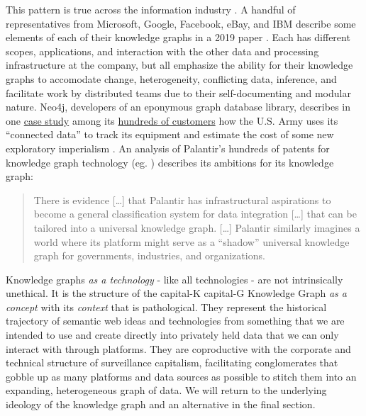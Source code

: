 This pattern is true across the information industry \cite{sequedaDesigningBuildingEnterprise2021} . A handful of
representatives from Microsoft, Google, Facebook, eBay, and IBM describe
some elements of each of their knowledge graphs in a 2019 paper \cite{noyIndustryscaleKnowledgeGraphs2019} . Each has different
scopes, applications, and interaction with the other data and processing
infrastructure at the company, but all emphasize the ability for their
knowledge graphs to accomodate change, heterogeneity, conflicting data,
inference, and facilitate work by distributed teams due to their
self-documenting and modular nature. Neo4j, developers of an eponymous
graph database library, describes in one
\href{https://neo4j.com/case-studies/us-army/}{case study} among its
\href{https://neo4j.com/customers/}{hundreds of customers} how the U.S.
Army uses its ``connected data'' to track its equipment and estimate the
cost of some new exploratory imperialism \cite{neo4jNeo4jArmyCase2021} . An analysis of Palantir's hundreds of
patents for knowledge graph technology (eg. \cite{cohenSystemMethodSharing2015, mathuraAutomatedDatabaseAnalysis2017, yousafSystemsMethodsUser2018, knudsonSystemsMethodsAnnotating2021} )
describes its ambitions for its knowledge graph:

\begin{quote}
There is evidence {[}\ldots{]} that Palantir has infrastructural
aspirations to become a general classification system for data
integration {[}\ldots{]} that can be tailored into a universal knowledge
graph. {[}\ldots{]} Palantir similarly imagines a world where its
platform might serve as a ``shadow'' universal knowledge graph for
governments, industries, and organizations. \cite{iliadisSeerSeenSurveying2022} 
\end{quote}

Knowledge graphs \emph{as a technology} - like all technologies - are
not intrinsically unethical. It is the structure of the capital-K
capital-G Knowledge Graph \emph{as a concept} with its \emph{context}
that is pathological. They represent the historical trajectory of
semantic web ideas and technologies from something that we are intended
to use and create directly into privately held data that we can only
interact with through platforms. They are coproductive with the
corporate and technical structure of surveillance capitalism,
facilitating conglomerates that gobble up as many platforms and data
sources as possible to stitch them into an expanding, heterogeneous
graph of data. We will return to the underlying ideology of the
knowledge graph and an alternative in the final section.

